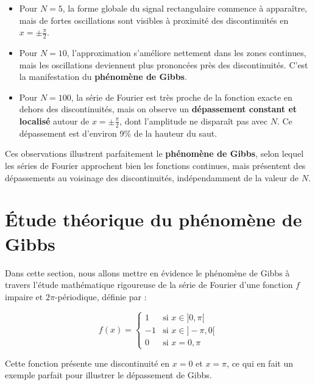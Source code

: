 \documentclass[11pt]{article} %
\begin{document}
\begin{large}
\begin{itemize}
  \item Pour \( N = 5 \), la forme globale du signal rectangulaire commence à apparaître, mais de fortes oscillations sont visibles à proximité des discontinuités en \( x = \pm \frac{\pi}{2} \).
  
  \item Pour \( N = 10 \), l’approximation s’améliore nettement dans les zones continues, mais les oscillations deviennent plus prononcées près des discontinuités. C’est la manifestation du \textbf{phénomène de Gibbs}.
  
  \item Pour \( N = 100 \), la série de Fourier est très proche de la fonction exacte en dehors des discontinuités, mais on observe un \textbf{dépassement constant et localisé} autour de \( x = \pm \frac{\pi}{2} \), dont l’amplitude ne disparaît pas avec \( N \). Ce dépassement est d’environ 9\% de la hauteur du saut.
\end{itemize}

Ces observations illustrent parfaitement le \textbf{phénomène de Gibbs}, selon lequel les séries de Fourier approchent bien les fonctions continues, mais présentent des dépassements au voisinage des discontinuités, indépendamment de la valeur de \( N \).












\newpage

\section{Étude théorique du phénomène de Gibbs}


Dans cette section, nous allons mettre en évidence le phénomène de Gibbs à travers l'étude mathématique rigoureuse de la série de Fourier d'une fonction \( f \) impaire et \( 2\pi \)-périodique, définie par :

\[
f(x) =
\begin{cases}
1 & \text{si } x \in ]0, \pi[ \\
-1 & \text{si } x \in ]-\pi, 0[ \\
0 & \text{si } x = 0, \pi
\end{cases}
\]

Cette fonction présente une discontinuité en \( x = 0 \) et \( x = \pi \), ce qui en fait un exemple parfait pour illustrer le dépassement de Gibbs.


\end{large}
\end{document}
